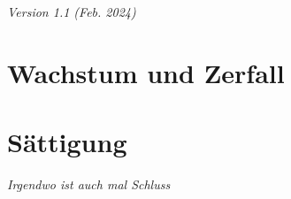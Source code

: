 


\renewcommand{\bbwAufgabenBlockID}{FctWZ}%

\renewcommand{\metaHeaderLine}{Exponentialfunktionen}
\renewcommand{\arbeitsblattTitel}{Aufgaben zu Wachstum und Zerfall}


\arbeitsblattHeader{}
\begin{center}\textit{\tiny{Version 1.1 (Feb. 2024)}}\end{center}

\section{Wachstum und Zerfall}
















\section{Sättigung}
\textit{Irgendwo ist auch mal Schluss}








